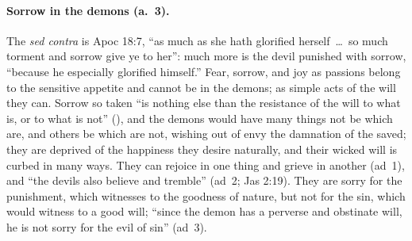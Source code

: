 \paragraph{Sorrow in the demons (a.~3).} The \emph{sed contra} is Apoc
18:7, ``as much as she hath glorified herself~\dots\ so much torment and
sorrow give ye to her'': much more is the devil punished with sorrow,
``because he especially glorified himself.'' Fear, sorrow, and joy as
passions belong to the sensitive appetite and cannot be in the demons;
as simple acts of the will they can. Sorrow so taken ``is nothing else
than the resistance of the will to what is, or to what is not''
(), and the demons would have many things not
be which are, and others be which are not, wishing out of envy the
damnation of the saved; they are deprived of the happiness they desire
naturally, and their wicked will is curbed in many ways. They can
rejoice in one thing and grieve in another (ad~1), and ``the devils also
believe and tremble'' (ad~2; Jas 2:19). They are sorry for the
punishment, which witnesses to the goodness of nature, but not for the
sin, which would witness to a good will; ``since the demon has a
perverse and obstinate will, he is not sorry for the evil of sin''
(ad~3).


